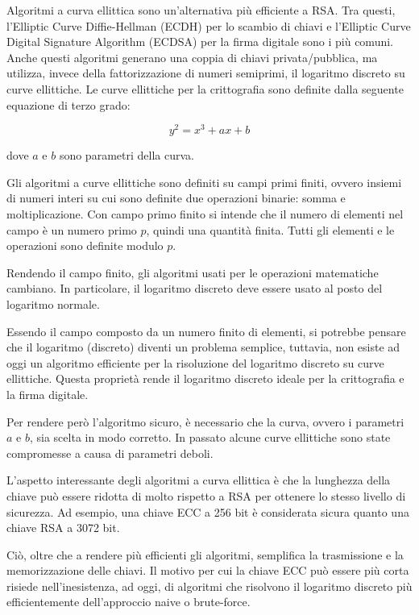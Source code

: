 \documentclass{article}
\begin{document}
Algoritmi a curva ellittica sono un'alternativa più efficiente a RSA.
Tra questi, l'Elliptic Curve Diffie-Hellman (ECDH) per lo scambio di chiavi e l'Elliptic Curve Digital Signature Algorithm (ECDSA) per la firma digitale sono i più comuni.
Anche questi algoritmi generano una coppia di chiavi privata/pubblica, ma utilizza, invece della fattorizzazione di numeri semiprimi, il logaritmo discreto su curve ellittiche.
Le curve ellittiche per la crittografia sono definite dalla seguente equazione di terzo grado:

$$y^2 = x^3 + ax + b$$

dove $a$ e $b$ sono parametri della curva.

Gli algoritmi a curve ellittiche sono definiti su campi primi finiti, ovvero insiemi di numeri interi su cui sono definite due operazioni binarie: somma e moltiplicazione.
Con campo primo finito si intende che il numero di elementi nel campo è un numero primo $p$, quindi una quantità finita. Tutti gli elementi e le operazioni sono definite modulo $p$.

Rendendo il campo finito, gli algoritmi usati per le operazioni matematiche cambiano.
In particolare, il logaritmo discreto deve essere usato al posto del logaritmo normale.

Essendo il campo composto da un numero finito di elementi, si potrebbe pensare che il logaritmo (discreto) diventi un problema semplice, tuttavia, non esiste ad oggi un algoritmo efficiente per la risoluzione del logaritmo discreto su curve ellittiche.
Questa proprietà rende il logaritmo discreto ideale per la crittografia e la firma digitale.

Per rendere però l'algoritmo sicuro, è necessario che la curva, ovvero i parametri $a$ e $b$, sia scelta in modo corretto. In passato alcune curve ellittiche sono state compromesse a causa di parametri deboli.

L'aspetto interessante degli algoritmi a curva ellittica è che la lunghezza della chiave può essere ridotta di molto rispetto a RSA per ottenere lo stesso livello di sicurezza.
Ad esempio, una chiave ECC a 256 bit è considerata sicura quanto una chiave RSA a 3072 bit.

Ciò, oltre che a rendere più efficienti gli algoritmi, semplifica la trasmissione e la memorizzazione delle chiavi.
Il motivo per cui la chiave ECC può essere più corta risiede nell'inesistenza, ad oggi, di algoritmi che risolvono il logaritmo discreto più efficientemente dell'approccio naive o brute-force.
\end{document}
